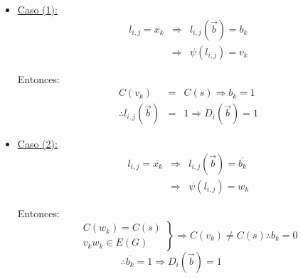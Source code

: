 \documentclass[12pt,a4paper]{report}
\newcounter{neq}
\begin{document}
				\begin{itemize}
					\item \underline{Caso (1):}
						\begin{eqnarray}
							\nonumber l_{i, j} = x_{k} &\Rightarrow & l_{i, j}(\overrightarrow{b}) = b_{k} \\
							\nonumber &\Rightarrow& \psi(l_{i, j}) = v_{k}
						\end{eqnarray}
						\par Entonces:
						\begin{eqnarray}
							\nonumber C(v_{k}) &=& C(s) \Rightarrow b_{k} = 1 \\
							\nonumber \therefore l_{i, j}(\overrightarrow{b}) &=& 1 \Rightarrow D_{i}(\overrightarrow{b}) = 1
						\end{eqnarray}
					\item \underline{Caso (2):}
						\begin{eqnarray}
							\nonumber l_{i, j} = \overline{x_{k}} &\Rightarrow & l_{i, j}(\overrightarrow{b}) = 	\overline{b_{k}} \\
							\nonumber &\Rightarrow& \psi(l_{i, j}) = w_{k}
						\end{eqnarray}
						\par Entonces:
						\begin{equation*}
		  				\left.
		  				\begin{array}{l}
		    		 		C(w_{k}) = C(s) \\
		    		 		v_{k} w_{k} \in E(G)
		  				\end{array}
		 			 		\right\rbrace
		 			 		\Rightarrow C(v_{k}) \neq C(s) \therefore b_{k} = 0
						\end{equation*}
						$\qquad\qquad\qquad\qquad\qquad$
						$\therefore \overline{b_{k}} = 1 \Rightarrow D_{i}(\overrightarrow{b}) = 1$
				\end{itemize}
\end{document}
